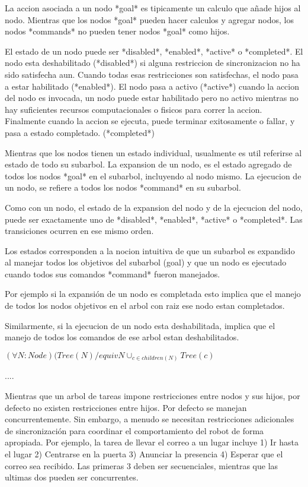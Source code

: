 \documentclass{article}
\begin{document}
La accion asociada a un nodo *goal* es tipicamente un calculo que añade
hijos al nodo. 
Mientras que los nodos *goal* pueden hacer calculos y agregar nodos, 
los nodos *commands* no pueden tener nodos *goal* como hijos.

El estado de un nodo puede ser *disabled*, *enabled*, *active* o *completed*.
El nodo esta deshabilitado (*disabled*) si alguna restriccion de sincronizacion
 no ha sido satisfecha aun.
Cuando todas esas restricciones son satisfechas, el nodo pasa a estar 
habilitado (*enabled*).
El nodo pasa a activo (*active*) cuando la accion del nodo es invocada, 
un nodo puede estar habilitado pero no activo mientras
no hay suficientes recursos computacionales o fisicos para correr la accion.
Finalmente cuando la accion se ejecuta, puede terminar exitosamente o fallar,
 y pasa a estado completado. (*completed*)

Mientras que los nodos tienen un estado individual, usualmente es util 
referirse al estado de todo su subarbol.
La expansion de un nodo, es el estado agregado de todos los nodos *goal* en el
 subarbol, incluyendo al nodo mismo.
La ejecucion de un nodo, se refiere a todos los nodos *command* en su subarbol.

Como con un nodo, el estado de la expansion del nodo y de la ejecucion del 
nodo, puede ser 
exactamente uno de *disabled*, *enabled*, *active* o *completed*. Las 
transiciones ocurren en ese mismo orden.

Los estados corresponden a la nocion intuitiva de que un subarbol es expandido
 al manejar todos los objetivos del subarbol (goal) y que
un nodo es ejecutado cuando todos sus comandos *command* fueron manejados.

Por ejemplo si la expansión de un nodo es completada esto implica que el 
manejo de todos los nodos objetivos en el arbol con raiz
ese nodo estan completados.

Similarmente, si la ejecucion de un nodo esta deshabilitada, implica que el 
manejo de todos los comandos de ese 
arbol estan deshabilitados.

$(\forall N: Node)(Tree(N) /equiv {N} \cup_{c \in children(N)} Tree (c)$

....

Mientras que un arbol de tareas impone restricciones entre nodos y sus hijos, 
por defecto no existen restricciones entre 
hijos. Por defecto se manejan concurrentemente.
Sin embargo, a menudo se necesitan restricciones adicionales de sincronización
para coordinar el comportamiento del robot de forma apropiada.
Por ejemplo, la tarea de llevar  el correo a un lugar incluye 
 1) Ir hasta el lugar
 2) Centrarse en la puerta
 3) Anunciar la presencia
 4) Esperar que el correo sea recibido.
Las primeras 3 deben ser secuenciales, mientras que las ultimas dos pueden 
ser concurrentes.
\end{document}
